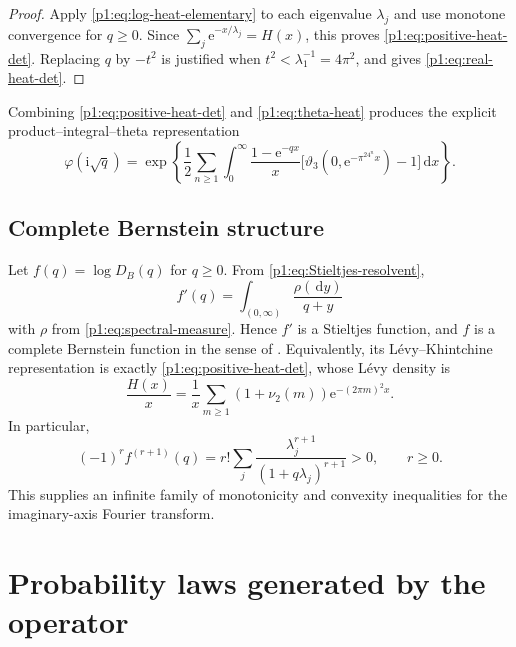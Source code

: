 \documentclass[11pt,oneside]{article}
\theoremstyle{definition}
\newcommand{\dd}{\,\mathrm d}
\newcommand{\e}{\mathrm e}
\newcommand{\ii}{\mathrm i}
\newcommand{\vtwo}{\nu_2}
\newcommand{\phiF}{\varphi}
\begin{document}
\begin{proof}
Apply \eqref{p1:eq:log-heat-elementary} to each eigenvalue \(\lambda_j\) and use monotone
convergence for \(q\ge0\).  Since
\(\sum_j\e^{-x/\lambda_j}=H(x)\), this proves
\eqref{p1:eq:positive-heat-det}.  Replacing \(q\) by \(-t^2\) is justified when
\(t^2<\lambda_1^{-1}=4\pi^2\), and gives \eqref{p1:eq:real-heat-det}.
\end{proof}

Combining \eqref{p1:eq:positive-heat-det} and \eqref{p1:eq:theta-heat} produces the explicit
product--integral--theta representation
\begin{equation}
 \phiF(\ii\sqrt q)=
 \exp\!\left\{
 \frac12\sum_{n\ge1}\int_0^\infty
 \frac{1-\e^{-qx}}x
 \bigl[\vartheta_3(0,\e^{-\pi^24^nx})-1\bigr]\dd x
 \right\}.
 \label{p1:eq:theta-det-combination}
\end{equation}

\subsection{Complete Bernstein structure}
\label{p1:sec:CBF}

Let \(f(q)=\log D_B(q)\) for \(q\ge0\).  From
\eqref{p1:eq:Stieltjes-resolvent},
\begin{equation}
 f'(q)=\int_{(0,\infty)}\frac{\rho(\dd y)}{q+y}
 \label{p1:eq:fprime-Stieltjes}
\end{equation}
with \(\rho\) from \eqref{p1:eq:spectral-measure}.  Hence \(f'\) is a Stieltjes function,
and \(f\) is a complete Bernstein function in the sense of
\cite{p1:SchillingBernstein}.  Equivalently, its L\'evy--Khintchine
representation is exactly \eqref{p1:eq:positive-heat-det}, whose L\'evy density is
\begin{equation}
 \frac{H(x)}x
 =\frac1x\sum_{m\ge1}(1+\vtwo(m))\e^{-(2\pi m)^2x}.
 \label{p1:eq:Levy-density}
\end{equation}
In particular,
\begin{equation}
 (-1)^r f^{(r+1)}(q)
 =r!\sum_j\frac{\lambda_j^{r+1}}{(1+q\lambda_j)^{r+1}}>0,
 \qquad r\ge0.
 \label{p1:eq:Bernstein-signs}
\end{equation}
This supplies an infinite family of monotonicity and convexity inequalities for the
imaginary-axis Fourier transform.

\section{Probability laws generated by the operator}
\label{p1:sec:prob-operator}
\end{document}
